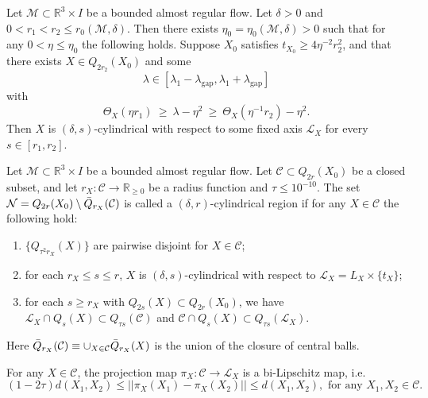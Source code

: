 \documentclass[10pt,a4paper]{amsart}
\newcommand{\RR}{\mathds{R}}
\newcommand{\cC}{\mathcal{C}}
\newcommand{\cL}{\mathcal{L}}
\newcommand{\cM}{\mathcal{M}}
\begin{document}
\begin{proposition}\label{p:propagation-cylinder}
Let $\cM\subset\RR^3\times I$ be a bounded almost regular flow. Let $\delta>0$ and $0<r_1<r_2\le r_0(\cM,\delta)$. Then there exists $\eta_0=\eta_0(\cM,\delta)>0$ such that for any $0<\eta\le\eta_0$ the following holds. Suppose $X_0$ satisfies $t_{X_0}\ge4\eta^{-2}r_2^2$, and that there exists $X\in Q_{2r_2}(X_0)$ and some
\[
\lambda\in[\lambda_1-\lambda_{\mathrm{gap}},\lambda_1+\lambda_{\mathrm{gap}}]
\]
with
\[
\Theta_X(\eta r_1)\ \ge\ \lambda-\eta^2\ \ge\ \Theta_X(\eta^{-1}r_2)-\eta^2.
\]
Then $X$ is $(\delta,s)$-cylindrical with respect to some fixed axis $\cL_X$ for every $s\in[r_1,r_2]$.
\end{proposition}

\begin{definition}\label{d:cylindricalregion}
Let $\cM \subset \RR^3 \times I$ be a bounded almost regular flow. Let $\mathcal{C} \subset Q_{2r}(X_0)$ be a closed subset, and let $r_X : \mathcal{C} \rightarrow \RR_{\ge0}$ be a radius function and $\tau \le 10^{-10}$. The set $\mathcal{N} = Q_{2r}(X_0) \setminus \Bar{Q}_{r_X}(\cC)$ is called a $(\delta, r)$-cylindrical region if for any $X\in \cC$ the following hold:
\begin{enumerate}
    \item $\{Q_{\tau^2 r_X}(X) \}$ are pairwise disjoint for $X\in \cC$;
    \item for each $r_X \leq s \leq r $, $X$ is $
    (\delta,s)$-cylindrical with respect to $\mathcal{L}_{X} = L_X \times \{t_X\}$;
    \item for each $s \geq r_X$ with $Q_{2s}(X)\subset Q_{2r}(X_0)$, we have $\mathcal{L}_{X} \cap Q_s(X) \subset Q_{\tau s}(\mathcal{C})$ and $\mathcal{C} \cap Q_s(X) \subset Q_{\tau s}(\mathcal{L}_{X})$.
\end{enumerate}
Here $\Bar{Q}_{r_X}(\cC) \equiv \cup_{X\in \cC}\bar Q_{r_X}(X)$ is the union of the closure of central balls. 
\end{definition}

\begin{lemma}\label{l:cylindrical region structure}
    For any $X\in \cC$, the projection map $\pi_X : \cC \to \cL_{X}$ is a bi-Lipschitz map, i.e. 
\begin{equation}\label{e:bilipschitz of centers}
    (1-2\tau)d(X_1,X_2) \le    ||\pi_X(X_1) - \pi_X(X_2)|| \le d(X_1,X_2), \text{ for any } X_1, X_2 \in \cC.
\end{equation}
\end{lemma}
\end{document}
